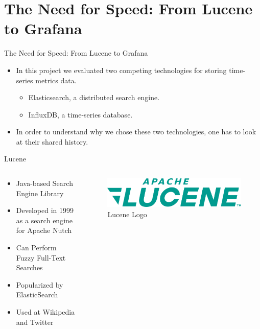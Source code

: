 \documentclass[compress,aspectratio=169]{beamer}
\begin{document}
\section[Overview]{The Need for Speed: From Lucene to Grafana}
\begin{frame}{The Need for Speed: From Lucene to Grafana}
  \begin{itemize}
    \item In this project we evaluated two competing technologies for storing time-series metrics data.
    \begin{itemize}
      \item Elasticsearch, a distributed search engine.
      \item InfluxDB, a time-series database.
    \end{itemize}
  \item In order to understand why we chose these two technologies, one has to look at their shared history.
  \end{itemize}
\end{frame}

\begin{frame}{Lucene}
\begin{columns}[T]
\begin{column}{0.5\textwidth}
\begin{itemize}
  \item Java-based Search Engine Library
  \item Developed in 1999 as a search engine for Apache Nutch
  \item Can Perform Fuzzy Full-Text Searches
  \item Popularized by ElasticSearch
  \item Used at Wikipedia and Twitter
\end{itemize}
\end{column}
\begin{column}{0.5\textwidth}
\begin{figure}
  \includegraphics[width=\textwidth]{lucene.png}
  \caption{Lucene Logo}
\end{figure}
\end{column}
\end{columns}
\end{frame}
\end{document}
